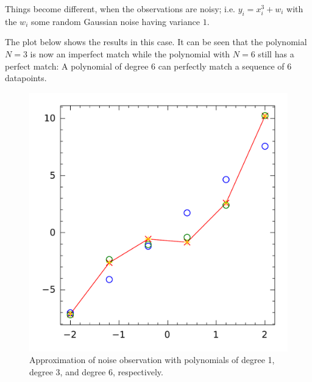 Things become different, when the observations are noisy; i.e. $y_i=x_i^3 + w_i$ with the $w_i$ some random Gaussian noise having variance $1$.

The plot below shows the results in this case. It can be seen that the polynomial $N=3$ is now an imperfect match while the polynomial with $N=6$ still has a perfect match: A polynomial of degree $6$ can perfectly match a sequence of $6$ datapoints.


\begin{figure}[htb!]
\centering
\includegraphics[scale=0.5]{images/ls_polyfit_with_noise.pdf}
\caption{Approximation of noise observation with polynomials of degree 1, degree 3, and degree 6, respectively.}
\end{figure}
